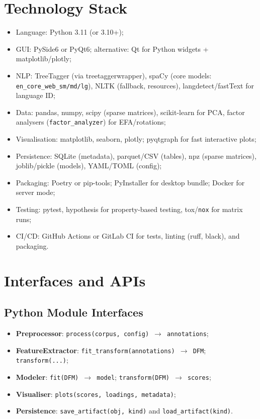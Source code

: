 \section{Technology Stack}
\begin{itemize}
    \item Language: Python 3.11 (or 3.10+);
    \item GUI: PySide6 or PyQt6; alternative: Qt for Python widgets + matplotlib/plotly;
    \item NLP: TreeTagger (via treetaggerwrapper), spaCy (core models: \texttt{en\_core\_web\_sm/md/lg}), NLTK (fallback, resources), langdetect/fastText for language ID;
    \item Data: pandas, numpy, scipy (sparse matrices), scikit-learn for PCA, factor analysers (\texttt{factor\_analyzer}) for EFA/rotations;
    \item Visualisation: matplotlib, seaborn, plotly; pyqtgraph for fast interactive plots;
    \item Persistence: SQLite (metadata), parquet/CSV (tables), npz (sparse matrices), joblib/pickle (models), YAML/TOML (config);
    \item Packaging: Poetry or pip-tools; PyInstaller for desktop bundle; Docker for server mode;
    \item Testing: pytest, hypothesis for property-based testing, tox/\texttt{nox} for matrix runs;
    \item CI/CD: GitHub Actions or GitLab CI for tests, linting (ruff, black), and packaging.
\end{itemize}

\section{Interfaces and APIs}
\subsection{Python Module Interfaces}
\begin{itemize}
    \item \textbf{Preprocessor}: \texttt{process(corpus, config) $\rightarrow$ annotations};
    \item \textbf{FeatureExtractor}: \texttt{fit\_transform(annotations) $\rightarrow$ DFM}; \texttt{transform(...)};
    \item \textbf{Modeler}: \texttt{fit(DFM) $\rightarrow$ model}; \texttt{transform(DFM) $\rightarrow$ scores};
    \item \textbf{Visualiser}: \texttt{plots(scores, loadings, metadata)};
    \item \textbf{Persistence}: \texttt{save\_artifact(obj, kind)} and \texttt{load\_artifact(kind)}.
\end{itemize}

